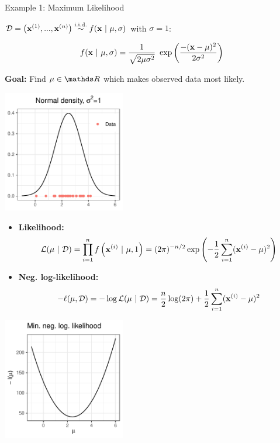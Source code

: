 \begin{vbframe}{Example 1: Maximum Likelihood}

$\D = \left(\xi[1], ..., \xi[n]\right) \overset{\text{i.i.d.}}{\sim} f(\xv ~|~ \mu, \sigma)$ with $\sigma = 1$: 

$$
	f(\xv ~|~ \mu, \sigma) = \frac{1}{\sqrt{2 \mu \sigma^{2}}}~\exp\left(\frac{-(\xv-\mu)^{2}}{2\sigma^{2}}\right)
$$

\textbf{Goal:} Find $\mu \in \R$ which makes observed data most likely. 

\begin{center}
	\begin{footnotesize}
	\includegraphics[width=0.4\textwidth, keepaspectratio]{figure_man/ml_normal_example_dnorm.pdf} 
	\end{footnotesize}
\end{center}

\framebreak 

\begin{itemize}
	\item \textbf{Likelihood:} \vspace*{-0.4cm}
 $$\mathcal{L}(\mu~|~\D)= \prod_{i=1}^{n} f\left(\xi~|~\mu, 1\right) = (2\pi)^{-n/2}\exp\left(-\frac{1}{2} \sum_{i=1}^{n} (\xi-\mu)^{2} \right)$$
	\item \textbf{Neg. log-likelihood:} \vspace*{-0.4cm}
$$- \ell(\mu, \D) = - \log \mathcal{L}(\mu~|~\D) = \frac{n}{2} \log(2\pi) + \frac{1}{2} \sum_{i=1}^{n} (\xi-\mu)^{2}$$
\end{itemize}

\vspace*{-0.3cm}

\begin{center}
	\begin{footnotesize}
	\includegraphics[width=0.4\textwidth, keepaspectratio]{figure_man/ml_normal_example_negloglike_nooptim.pdf} 
	\end{footnotesize}
\end{center}
\framebreak 


\end{vbframe}
